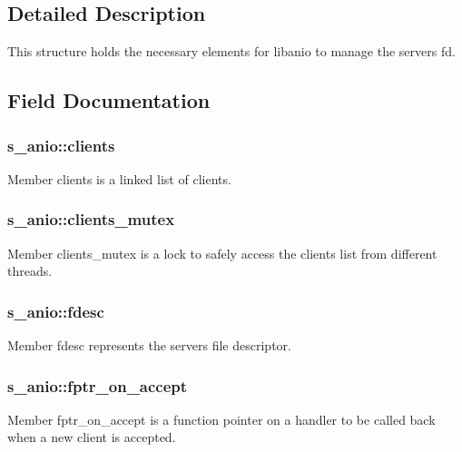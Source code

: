 \subsection{Detailed Description}
This structure holds the necessary elements for libanio to manage the server\textquotesingle{}s fd. 

\subsection{Field Documentation}
\hypertarget{structs__anio_aa18ac90a5592f8ce8d870cd2fa0ef9f2}{}
\subsubsection[{clients}]{\setlength{\rightskip}{0pt plus 5cm}s\+\_\+anio\+::clients}\label{structs__anio_aa18ac90a5592f8ce8d870cd2fa0ef9f2}
Member \textquotesingle{}clients\textquotesingle{} is a linked list of clients. \hypertarget{structs__anio_ad37ba794a80b637d4ff4f52696287d68}{}
\subsubsection[{clients\+\_\+mutex}]{\setlength{\rightskip}{0pt plus 5cm}s\+\_\+anio\+::clients\+\_\+mutex}\label{structs__anio_ad37ba794a80b637d4ff4f52696287d68}
Member \textquotesingle{}clients\+\_\+mutex\textquotesingle{} is a lock to safely access the clients list from different threads. \hypertarget{structs__anio_a8f2299298072be288b2e8023ddb1876b}{}
\subsubsection[{fdesc}]{\setlength{\rightskip}{0pt plus 5cm}s\+\_\+anio\+::fdesc}\label{structs__anio_a8f2299298072be288b2e8023ddb1876b}
Member \textquotesingle{}fdesc\textquotesingle{} represents the server\textquotesingle{}s file descriptor. \hypertarget{structs__anio_a02d4a0107368dc5ebb180836f67129af}{}
\subsubsection[{fptr\+\_\+on\+\_\+accept}]{\setlength{\rightskip}{0pt plus 5cm}s\+\_\+anio\+::fptr\+\_\+on\+\_\+accept}\label{structs__anio_a02d4a0107368dc5ebb180836f67129af}
Member \textquotesingle{}fptr\+\_\+on\+\_\+accept\textquotesingle{} is a function pointer on a handler to be called back when a new client is accepted. \hypertarget{structs__anio_af681ce20da5e7d7df16e5c7c3af6110e}{}
